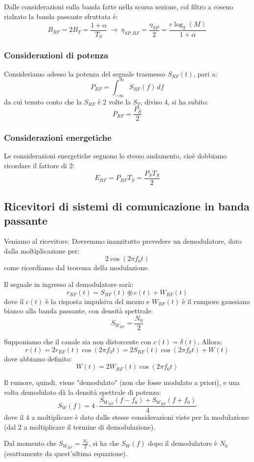 \documentclass[a4paper,11pt]{article}
\begin{document}
Dalle considerazioni sulla banda fatte nella scorsa sezione, col filtro a coseno rialzato la banda passante sfruttata è:
$$
B_{RF} = 2 B_T = \frac{1 + \alpha}{T_S} \ \rightarrow \ \eta_{SP, RF} = \frac{\eta_{SP}}{2} = \frac{r \log_2 (M)}{1 + \alpha} 
$$

\subsubsection{Considerazioni di potenza}
Consideriamo adesso la potenza del segnale trasmesso $S_{RF}(t)$, pari a:
$$
P_{RF} = \int_{-\infty}^{\infty} S_{RF}(f) \, df
$$
da cui tenuto conto che la $S_{RF}$ è 2 volte la $S_T$, diviso $4$, si ha subito:
$$
P_{RF} = \frac{P_S}{2}
$$

\subsubsection{Considerazioni energetiche}
Le considerazioni energetiche seguono lo stesso andamento, cioè dobbiamo ricordare il fattore di $2$:
$$
E_{RF} = P_{RF} T_S = \frac{P_S T_S}{2}
$$

\subsection{Ricevitori di sistemi di comunicazione in banda passante}
Veniamo al ricevitore. Dovremmo inanzitutto prevedere un demodulatore, dato dalla moltiplicazione per:
$$
2 \cos(2 \pi f_0 t)
$$
come ricordiamo dal teorema della modulazione.

Il segnale in ingresso al demodulatore sarà:
$$
r_{RF}(t) = S_{RF}(t) \circledast c(t) + W_{RF}(t)
$$
dove il $c(t)$ è la risposta impulsiva del mezzo e $W_{RF}(t)$ è il rumpore gaussiano bianco alla banda passante, con densità spettrale:
$$
S_{W_{RF}} = \frac{N_0}{2}
$$

Supponiamo che il canale sia non distorcente con $c(t) = \delta(t)$. Allora:
$$
r(t) = 2 r_{RF}(t) \cos(2 \pi f_0t) = 2S_{RF}(t) \cos (2 \pi f_0 t) + W(t)
$$
dove abbiamo definito:
$$
W(t) = 2 W_{RF}(t) \cos(2 \pi f_0 t)
$$

Il rumore, quindi, viene "demodulato" (non che fosse modulato a priori), e una volta demodulato dà la densità spettrale di potenza:
$$
S_W(f) = 4 \cdot \frac{ S_{W_{RF}}(f - f_0) + S_{W_{RF}}(f + f_0) }{4}
$$
dove il $4$ a moltiplicare è dato dalle stesse considerazioni viste per la modulazione (dal $2$ a moltiplicare il termine di demodulazione).

Dal momento che $S_{W_{RF}} = \frac{N_0}{2}$, si ha che $S_W(f)$ dopo il demodulatore è $N_0$ (esattamente da quest'ultima equazione).
\end{document}
